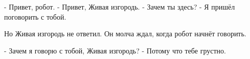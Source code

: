 - Привет, робот.
- Привет, Живая изгородь.
- Зачем ты здесь?
- Я пришёл поговорить с тобой.

Но Живая изгородь не ответил. Он молча ждал, когда робот начнёт говорить.

- Зачем я говорю с тобой, Живая изгородь?
- Потому что тебе грустно.